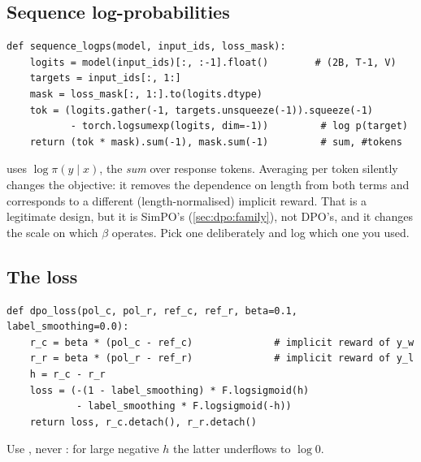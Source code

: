 \subsection{Sequence log-probabilities}

\begin{lstlisting}[caption={Response-only sequence log-probabilities. The logit at position $t$ scores token $t{+}1$, so both targets and mask shift by one. \code{gather} minus \code{logsumexp} avoids materialising a $(2B,T,V)$ log-softmax tensor.},label={lst:dpo:logps}]
def sequence_logps(model, input_ids, loss_mask):
    logits = model(input_ids)[:, :-1].float()        # (2B, T-1, V)
    targets = input_ids[:, 1:]
    mask = loss_mask[:, 1:].to(logits.dtype)
    tok = (logits.gather(-1, targets.unsqueeze(-1)).squeeze(-1)
           - torch.logsumexp(logits, dim=-1))         # log p(target)
    return (tok * mask).sum(-1), mask.sum(-1)         # sum, #tokens
\end{lstlisting}

\begin{pitfall}
 uses $\log\pi(y\mid x)$, the \emph{sum} over response tokens. Averaging per token
silently changes the objective: it removes the dependence on length from both terms and
corresponds to a different (length-normalised) implicit reward. That is a legitimate design,
but it is SimPO's (\cref{sec:dpo:family}), not DPO's, and it changes the scale on which $\beta$
operates. Pick one deliberately and log which one you used.
\end{pitfall}

\subsection{The loss}

\begin{lstlisting}[caption={DPO with optional conservative label smoothing (cDPO, \cref{sec:dpo:family}). The rewards are returned detached for logging.},label={lst:dpo:loss}]
def dpo_loss(pol_c, pol_r, ref_c, ref_r, beta=0.1, label_smoothing=0.0):
    r_c = beta * (pol_c - ref_c)              # implicit reward of y_w
    r_r = beta * (pol_r - ref_r)              # implicit reward of y_l
    h = r_c - r_r
    loss = (-(1 - label_smoothing) * F.logsigmoid(h)
            - label_smoothing * F.logsigmoid(-h))
    return loss, r_c.detach(), r_r.detach()
\end{lstlisting}

Use , never : for large negative $h$ the
latter underflows to $\log 0$.

